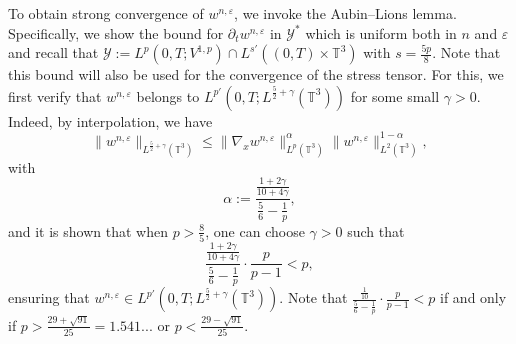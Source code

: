 \documentclass[10pt,reqno]{amsart}
\numberwithin{equation}{section}
\newcommand{\T}{\mathbb T}
\newcommand{\bq}{\begin{equation}}
\newcommand{\eq}{\end{equation}}
\newcommand{\e}{\varepsilon}
\newcommand{\pa}{\partial}
\begin{document}
To obtain strong convergence of $w^{n,\e}$, we invoke the Aubin--Lions lemma. Specifically, we show the bound for $\pa_t w^{n,\e}$ in $\mathcal{Y}^*$ which is uniform both in $n$ and $\e$ and recall that $\mathcal{Y} := L^p(0,T; V^{1,p}) \cap L^{s'}((0,T)\times \T^3)$ with $s = \frac{5p}{8}$.  Note that this bound will also be used for the convergence of the stress tensor. For this, we first verify that $w^{n,\e}$ belongs to $L^{p'}(0,T;L^{\frac{5}{2} + \gamma}(\T^3))$ for some small $\gamma > 0$. Indeed, by interpolation, we have
\[
\|w^{n,\e}\|_{L^{\frac{5}{2}+\gamma}(\T^3)} \le \|\nabla_x w^{n,\e}\|_{L^p(\T^3)}^{\alpha} \|w^{n,\e}\|_{L^2(\T^3)}^{1-\alpha},
\]
with
\[
\alpha := \frac{\frac{1 + 2\gamma}{10 + 4\gamma}}{\frac{5}{6} - \frac{1}{p}},
\]
and it is shown that when $p > \frac{8}{5}$, one can choose $\gamma > 0$ such that
\bq\label{p_cond_coup}
\frac{\frac{1 + 2\gamma}{10 + 4\gamma}}{\frac{5}{6} - \frac{1}{p}} \cdot \frac{p}{p - 1} < p,
\eq
ensuring that $w^{n,\e} \in L^{p'}(0,T;L^{\frac{5}{2} + \gamma}(\T^3))$. Note that $\frac{\frac{1}{10}}{\frac 56 -\frac1p} \cdot \frac{p}{p-1} < p$ if and only if $p>\frac{29+\sqrt{91}}{25} =1.541...$ or $p< \frac{29 -\sqrt{91}}{25}$.
\end{document}
